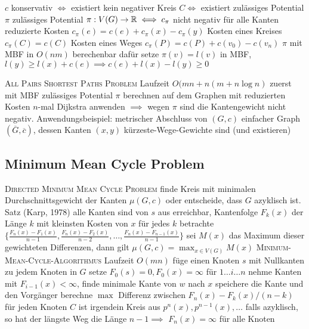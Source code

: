 \begin{outline}
\1 $c$ konservativ $\iff$ existiert kein negativer Kreis $C \iff$ existiert zulässiges Potential $\pi$
    \2 zulässiges Potential $\pi: V(G) \rightarrow \mathbb{R} \iff c_\pi$ nicht negativ für alle Kanten
    \2 reduzierte Kosten $c_\pi(e)=c(e)+c_\pi(x)-c_\pi(y)$
        \3 Kosten eines Kreises $c_\pi(C)=c(C)$
        \3 Kosten eines Weges $c_\pi(P)=c(P)+c(v_0)-c(v_n)$
    \2 $\pi$ mit MBF in $O(nm)$ berechenbar
        \3 dafür setze $\pi(v)=l(v)$
        \3 in MBF, $l(y)\geq l(x) + c(e) \implies c(e)+l(x)-l(y) \geq 0$

    \1 \textsc{All Pairs Shortest Paths Problem}
        \2 Laufzeit $O(mn+n(m+n\log n)$
            \3 zuerst mit MBF zulässiges Potential $\pi$ berechnen
            \3 auf dem Graphen mit reduzierten Kosten $n$-mal Dijkstra anwenden $\implies$ wegen $\pi$ sind die Kantengewicht nicht negativ.
        \2 Anwendungsbeispiel: metrischer Abschluss von $(G,c)$
            \3 einfacher Graph $(\overline{G}, \overline{c})$, dessen Kanten $(x,y)$ kürzeste-Wege-Gewichte sind (und existieren)
\end{outline}

\subsection{Minimum Mean Cycle Problem}
\begin{outline}
    \1 \textsc{Directed Minimum Mean Cycle Problem} 
        \2 finde Kreis mit minimalen Durchschnittsgewicht der Kanten $\mu(G,c)$ oder entscheide, dass $G$ azyklisch ist. 
    \1 Satz (Karp, 1978)
        \2 alle Kanten sind von $s$ aus erreichbar,
        \2 Kantenfolge $F_k(x)$ der Länge $k$ mit kleinsten Kosten von $x$
        \2 für jedes $k$ betrachte $\{ \frac{F_n(x)-F_1(x)}{n-1}, \frac{F_n(x)-F_2(x)}{n-2},\ldots,\frac{F_n(x)-F_{n-1}(x)}{n-1} \}$
        \2 sei $M(x)$ das Maximum dieser gewichteten Differenzen, dann gilt $\mu(G,c) = \max_{x\in V(G)} M(x)$ 
    \1 \textsc{Minimum-Mean-Cycle-Algorithmus}
        \2 Laufzeit $O(mn)$
            \3 füge einen Knoten $s$ mit Nullkanten zu jedem Knoten in $G$
            \3 setze $F_0 (s) = 0, F_0(x)=\infty$
            \3 für $1\ldots i\ldots n$ nehme Kanten mit $F_{i-1}(x)<\infty$, finde minimale Kante von $w$ nach $x$
            \3 speichere die Kante und den Vorgänger 
            \3 berechne $\max$ Differenz zwischen $F_n(x)-F_k(x)/(n-k)$ für jeden Knoten
            \3 $C$ ist irgendein Kreis aus $p^n(x),p^{n-1}(x),\ldots$
            \3 falls azyklisch, so hat der längste Weg die Länge $n-1 \implies$ $F_n(x)=\infty$ für alle Knoten
\end{outline}

